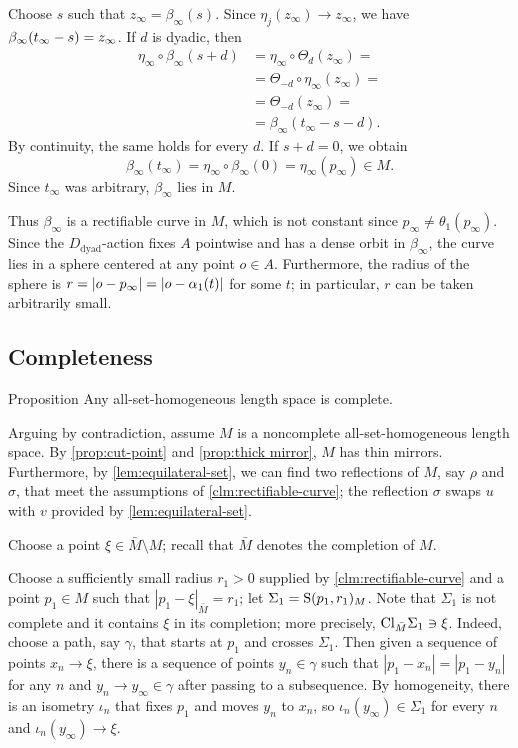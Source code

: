 \documentclass[a4paper,10pt]{article}
\begin{document}
Choose $s$ such that $z_\infty=\beta_\infty(s)$.
Since $\eta_j(z_\infty)\to z_\infty$,
we have $\beta_\infty(t_\infty-s)\z=z_\infty$.
If $d$ is dyadic, then
\begin{align*}
\eta_\infty\circ\beta_\infty(s+d)
&=\eta_\infty\circ\Theta_d(z_\infty)=
\\
&=\Theta_{-d}\circ\eta_\infty(z_\infty)=
\\
&=\Theta_{-d}(z_\infty)=
\\
&=\beta_\infty(t_\infty-s-d).
\end{align*}
By continuity, the same holds for every $d$.
If $s+d=0$, we obtain
\[
\beta_\infty(t_\infty)=\eta_\infty\circ\beta_\infty(0)=\eta_\infty(p_\infty)\in M.
\]
Since $t_\infty$ was arbitrary, $\beta_\infty$ lies in $M$.

Thus $\beta_\infty$ is a rectifiable curve in $M$,
which is not constant since $p_\infty\ne \theta_1(p_\infty)$.
Since the $D_{\mathrm{dyad}}$-action fixes $A$ pointwise and has a dense orbit in $\beta_\infty$, the curve lies in a sphere centered at any point $o\in A$.
Furthermore, the radius of the sphere is $r=|o-p_\infty|\z=|o-\alpha_1(t)|$ for some $t$;
in particular, $r$ can be taken arbitrarily small.
\qeds

\subsection*{Completeness}\label{sec:completeness}

\begin{thm}{Proposition}\label{prop:complete}
Any all-set-homogeneous length space is complete.
\end{thm}

Arguing by contradiction, assume $M$ is a noncomplete all-set-homogeneous length space.
By \ref{prop:cut-point} and \ref{prop:thick mirror}, $M$ has thin mirrors.
Furthermore, by \ref{lem:equilateral-set}, we can find two reflections of $M$, say $\rho$ and $\sigma$, that meet the assumptions of \ref{clm:rectifiable-curve}; the reflection $\sigma$ swaps $u$ with $v$ provided by \ref{lem:equilateral-set}.

Choose a point $\xi\in \bar M\setminus M$; recall that $\bar M$ denotes the completion of $M$.

Choose a sufficiently small radius $r_1>0$ supplied by \ref{clm:rectifiable-curve} and a point $p_1\in M$ such that $|p_1-\xi|_{\bar M}=r_1$;
let $\Sigma_1=\mathrm{S}(p_1,r_1)_M$.
Note that $\Sigma_1$ is not complete and it contains $\xi$ in its completion;
more precisely, $\mathrm{Cl}_{\bar M}\Sigma_1\ni \xi$.
Indeed, choose a path, say $\gamma$, that starts at $p_1$ and crosses $\Sigma_1$.
Then given a sequence of points $x_n\to \xi$, there is a sequence of points $y_n\in\gamma$ such that $|p_1-x_n|=|p_1-y_n|$ for any $n$ and $y_n\to y_\infty\in\gamma$ after passing to a subsequence.
By homogeneity, there is an isometry $\iota_n$ that fixes $p_1$ and moves $y_n$ to $x_n$, so $\iota_n(y_\infty)\in \Sigma_1$ for every $n$ and $\iota_n(y_\infty)\to \xi$.
\end{document}
